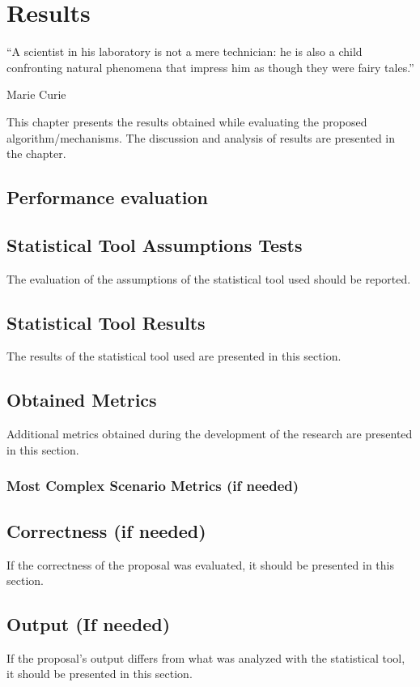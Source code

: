 \chapter{Results}
\epigraph{``A scientist in his laboratory is not a mere technician: he is also a child confronting natural phenomena that impress him as though they were fairy tales.''}{\vspace{10pt}Marie Curie}
\label{chapter:results}
\newpage

This chapter presents the results obtained while evaluating the proposed algorithm/mechanisms. The discussion and analysis of results are presented in the  chapter.


\section{Performance evaluation}
 
\section{Statistical Tool Assumptions Tests}
The evaluation of the assumptions of the statistical tool used should be reported.

\section{Statistical Tool Results}
The results of the statistical tool used are presented in this section.

\section{Obtained Metrics}
Additional metrics obtained during the development of the research are presented in this section. 


\subsection{Most Complex Scenario Metrics (if needed)}


\section{Correctness (if needed)}
If the correctness of the proposal was evaluated, it should be presented in this section.
\section{Output (If needed)}
If the proposal's output differs from what was analyzed with the statistical tool, it should be presented in this section.
\newpage

